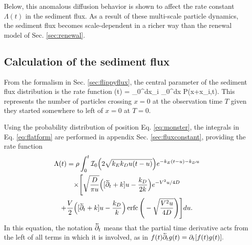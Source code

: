Below, this anomalous diffusion behavior \citep[cf.][]{Sokolov2012} is shown to affect the rate constant $\Lambda(t)$ in the sediment flux. As a result of these multi-scale particle dynamics, the sediment flux becomes scale-dependent in a richer way than the renewal model of Sec. \ref{sec:renewal}.

\subsection{Calculation of the sediment flux}

From the formalism in Sec. \ref{sec:flippyflux}, the central parameter of the sediment flux distribution is the rate function
\be \Lambda(t) = \rho \int_0^\infty dx_i \int_0^\infty dx P(x+x_i,t). \label{eq:flatform}\ee
This represents the number of particles crossing $x=0$ at the observation time $T$ given they started somewhere to left of $x=0$ at $T=0$.

Using the probability distribution of position Eq. \ref{eq:monster}, the integrals in Eq. \ref{eq:flatform} are performed in appendix Sec. \ref{sec:fluxconstant}, providing the rate function
\begin{multline} 
\Lambda(t) = \rho \int_0^t \mathcal{I}_0\Big(2\sqrt{k_Ek_Du(t-u)}\Big)e^{-k_E(t-u)-k_D u} \\
\times \Bigg[\sqrt{\frac{D}{\pi u}}\Big([\cev{\partial_t} + k]u-\frac{k_D}{2 k}\Big)e^{-V^2 u/4D} \\+ \frac{V}{2}\Big([\cev{\partial_t} + k]u -\frac{k_D}{k}\Big) \erfc\Bigg(-\sqrt{\frac{V^2 u}{4D}}\Bigg)\Bigg] du. \label{eq:fluxy}
\end{multline}
In this equation, the notation $\cev{\partial_t}$ means that the partial time derivative acts from the left of all terms in which it is involved, as in $f(t)\cev{\partial_t} g(t) = \partial_t [f(t)g(t)].$

